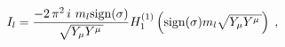 \begin{equation}
I_l 
 = 
\frac{-2 \, \pi^2 \, i\, \, m_l {\rm sign}(\sigma)  }{\sqrt{Y_\mu Y^\mu \,}}
H_1^{(1)} \left( {\rm sign}(\sigma) m_l \sqrt{Y_\mu Y^\mu \,} \right) \;,
\label{I_afim}
\end{equation}

